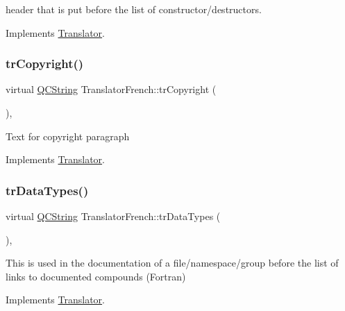 header that is put before the list of constructor/destructors. 

Implements \mbox{\hyperlink{class_translator}{Translator}}.

\mbox{\label{class_translator_french_a7e6487da7b43eda9b21917c22148cbfc}} 
\subsubsection{\texorpdfstring{trCopyright()}{trCopyright()}}
{\footnotesize\ttfamily virtual \mbox{\hyperlink{class_q_c_string}{Q\+C\+String}} Translator\+French\+::tr\+Copyright (\begin{DoxyParamCaption}{ }\end{DoxyParamCaption})\hspace{0.3cm}{\ttfamily [inline]}, {\ttfamily [virtual]}}

Text for copyright paragraph 

Implements \mbox{\hyperlink{class_translator}{Translator}}.

\mbox{\label{class_translator_french_abbcf882ce17a9a83ce3ed59f2e046445}} 
\subsubsection{\texorpdfstring{trDataTypes()}{trDataTypes()}}
{\footnotesize\ttfamily virtual \mbox{\hyperlink{class_q_c_string}{Q\+C\+String}} Translator\+French\+::tr\+Data\+Types (\begin{DoxyParamCaption}{ }\end{DoxyParamCaption})\hspace{0.3cm}{\ttfamily [inline]}, {\ttfamily [virtual]}}

This is used in the documentation of a file/namespace/group before the list of links to documented compounds (Fortran) 

Implements \mbox{\hyperlink{class_translator}{Translator}}.

\mbox{\label{class_translator_french_afbf8da1924767d230d13c998fa2c56ee}} 
